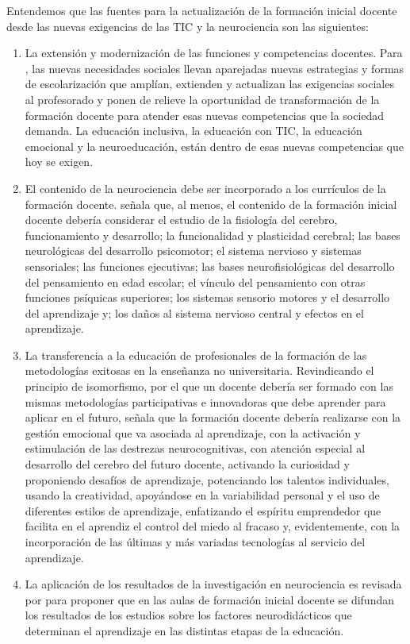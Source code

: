 \documentclass[spanish]{textolivre}
\begin{document}
Entendemos que las fuentes para la actualización de la formación inicial docente desde las nuevas exigencias de las TIC y la neurociencia son las siguientes:

\begin{enumerate}
    \item La extensión y modernización de las funciones y competencias docentes. Para \textcite{schimf-herken_modelo_2006}, las nuevas necesidades sociales llevan aparejadas nuevas estrategias y formas de escolarización que amplían, extienden y actualizan las exigencias sociales al profesorado y ponen de relieve la oportunidad de transformación de la formación docente para atender esas nuevas competencias que la sociedad demanda. La educación inclusiva, la educación con TIC, la educación emocional y la neuroeducación, están dentro de esas nuevas competencias que hoy se exigen. 
    \item El contenido de la neurociencia debe ser incorporado a los currículos de la formación docente. \textcite{calzadilla_perez_integracion_2017} señala que, al menos, el contenido de la formación inicial docente debería considerar el estudio de la fisiología del cerebro, funcionamiento y desarrollo; la funcionalidad y plasticidad cerebral; las bases neurológicas del desarrollo psicomotor; el sistema nervioso y sistemas sensoriales; las funciones ejecutivas; las bases neurofisiológicas del desarrollo del pensamiento en edad escolar; el vínculo del pensamiento con otras funciones psíquicas superiores; los sistemas sensorio motores y el desarrollo del aprendizaje y; los daños al sistema nervioso central y efectos en el aprendizaje.
    \item La transferencia a la educación de profesionales de la formación de las metodologías exitosas en la enseñanza no universitaria. Revindicando el principio de isomorfismo, por el que un docente debería ser formado con las mismas metodologías participativas e innovadoras que debe aprender para aplicar en el futuro, \textcite{arturo_obando_plan_2020} señala que la formación docente debería realizarse con la gestión emocional que va asociada al aprendizaje, con la activación y estimulación  de las destrezas neurocognitivas, con atención especial al desarrollo del cerebro del futuro docente, activando la curiosidad y proponiendo desafíos de aprendizaje, potenciando los talentos individuales, usando la creatividad, apoyándose en la variabilidad personal y el uso de diferentes estilos de aprendizaje, enfatizando el espíritu emprendedor que facilita en el aprendiz el control del  miedo al fracaso y, evidentemente, con la incorporación de las últimas y más variadas tecnologías al servicio del aprendizaje.
    \item La aplicación de los resultados de la investigación en neurociencia es revisada por \textcite{acta_caraballo_concepcion_2021} para proponer que en las aulas de formación inicial docente se difundan los resultados de los estudios sobre los factores neurodidácticos que determinan el aprendizaje en las distintas etapas de la educación.
\end{enumerate}
\end{document}
